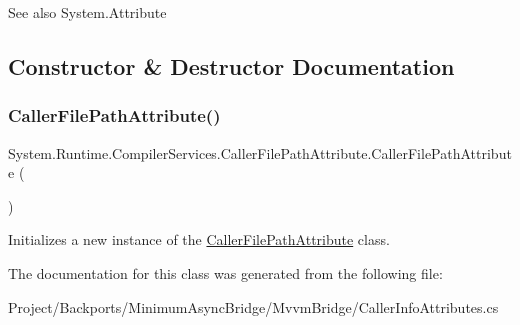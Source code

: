 \begin{DoxySeeAlso}{See also}
System.\+Attribute


\end{DoxySeeAlso}


\subsection{Constructor \& Destructor Documentation}
\mbox{\label{class_system_1_1_runtime_1_1_compiler_services_1_1_caller_file_path_attribute_ad2723ac88d5738b2770451462ef455a7}} 
\subsubsection{\texorpdfstring{Caller\+File\+Path\+Attribute()}{CallerFilePathAttribute()}}
{\footnotesize\ttfamily System.\+Runtime.\+Compiler\+Services.\+Caller\+File\+Path\+Attribute.\+Caller\+File\+Path\+Attribute (\begin{DoxyParamCaption}{ }\end{DoxyParamCaption})\hspace{0.3cm}{\ttfamily [inline]}}



Initializes a new instance of the \hyperlink{class_system_1_1_runtime_1_1_compiler_services_1_1_caller_file_path_attribute}{Caller\+File\+Path\+Attribute} class. 



The documentation for this class was generated from the following file\+:\begin{DoxyCompactItemize}
\item 
Project/\+Backports/\+Minimum\+Async\+Bridge/\+Mvvm\+Bridge/Caller\+Info\+Attributes.\+cs\end{DoxyCompactItemize}
